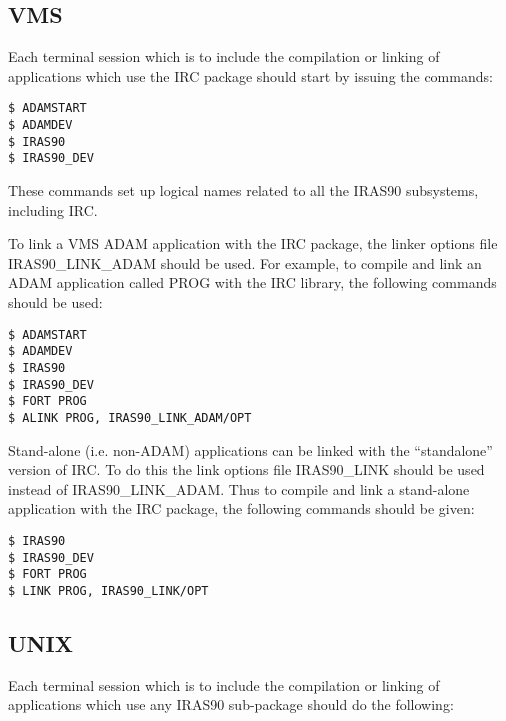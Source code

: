 \subsection{VMS}
Each terminal session which is to include the compilation or linking of
applications which use the IRC package should start by issuing the commands:

\begin{verbatim}
$ ADAMSTART
$ ADAMDEV
$ IRAS90
$ IRAS90_DEV
\end{verbatim}

These commands set up logical names related to all the IRAS90
subsystems, including IRC.

To link a VMS ADAM application with the IRC package, the linker options file
IRAS90\_LINK\_ADAM should be used. For example, to compile and link an ADAM
application called PROG with the IRC library, the following commands should be
used:

\begin{verbatim}
$ ADAMSTART
$ ADAMDEV
$ IRAS90
$ IRAS90_DEV
$ FORT PROG
$ ALINK PROG, IRAS90_LINK_ADAM/OPT
\end{verbatim}

Stand-alone (i.e. non-ADAM) applications can be linked with the ``standalone''
version of IRC. To do this the link options file IRAS90\_LINK should be used
instead of IRAS90\_LINK\_ADAM. Thus to compile and link a stand-alone
application with the IRC package, the following commands should be given:

\begin{verbatim}
$ IRAS90
$ IRAS90_DEV
$ FORT PROG
$ LINK PROG, IRAS90_LINK/OPT
\end{verbatim}

\subsection{UNIX}

Each terminal session which is to include the compilation or linking of
applications which use any IRAS90 sub-package should do the following:

